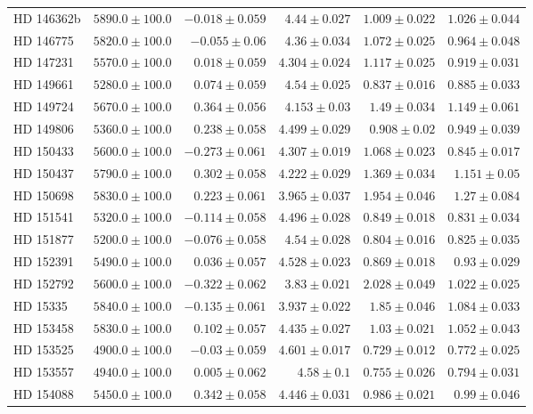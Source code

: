 \begin{longtable*}{lrrrrr}
HD 146362b & $5890.0\pm 100.0$ & $-0.018\pm 0.059$ & $4.44\pm 0.027$ & $1.009\pm 0.022$ & $1.026\pm 0.044$ \\ 
HD 146775 & $5820.0\pm 100.0$ & $-0.055\pm 0.06$ & $4.36\pm 0.034$ & $1.072\pm 0.025$ & $0.964\pm 0.048$ \\ 
HD 147231 & $5570.0\pm 100.0$ & $0.018\pm 0.059$ & $4.304\pm 0.024$ & $1.117\pm 0.025$ & $0.919\pm 0.031$ \\ 
HD 149661 & $5280.0\pm 100.0$ & $0.074\pm 0.059$ & $4.54\pm 0.025$ & $0.837\pm 0.016$ & $0.885\pm 0.033$ \\ 
HD 149724 & $5670.0\pm 100.0$ & $0.364\pm 0.056$ & $4.153\pm 0.03$ & $1.49\pm 0.034$ & $1.149\pm 0.061$ \\ 
HD 149806 & $5360.0\pm 100.0$ & $0.238\pm 0.058$ & $4.499\pm 0.029$ & $0.908\pm 0.02$ & $0.949\pm 0.039$ \\ 
HD 150433 & $5600.0\pm 100.0$ & $-0.273\pm 0.061$ & $4.307\pm 0.019$ & $1.068\pm 0.023$ & $0.845\pm 0.017$ \\ 
HD 150437 & $5790.0\pm 100.0$ & $0.302\pm 0.058$ & $4.222\pm 0.029$ & $1.369\pm 0.034$ & $1.151\pm 0.05$ \\ 
HD 150698 & $5830.0\pm 100.0$ & $0.223\pm 0.061$ & $3.965\pm 0.037$ & $1.954\pm 0.046$ & $1.27\pm 0.084$ \\ 
HD 151541 & $5320.0\pm 100.0$ & $-0.114\pm 0.058$ & $4.496\pm 0.028$ & $0.849\pm 0.018$ & $0.831\pm 0.034$ \\ 
HD 151877 & $5200.0\pm 100.0$ & $-0.076\pm 0.058$ & $4.54\pm 0.028$ & $0.804\pm 0.016$ & $0.825\pm 0.035$ \\ 
HD 152391 & $5490.0\pm 100.0$ & $0.036\pm 0.057$ & $4.528\pm 0.023$ & $0.869\pm 0.018$ & $0.93\pm 0.029$ \\ 
HD 152792 & $5600.0\pm 100.0$ & $-0.322\pm 0.062$ & $3.83\pm 0.021$ & $2.028\pm 0.049$ & $1.022\pm 0.025$ \\ 
HD 15335 & $5840.0\pm 100.0$ & $-0.135\pm 0.061$ & $3.937\pm 0.022$ & $1.85\pm 0.046$ & $1.084\pm 0.033$ \\ 
HD 153458 & $5830.0\pm 100.0$ & $0.102\pm 0.057$ & $4.435\pm 0.027$ & $1.03\pm 0.021$ & $1.052\pm 0.043$ \\ 
HD 153525 & $4900.0\pm 100.0$ & $-0.03\pm 0.059$ & $4.601\pm 0.017$ & $0.729\pm 0.012$ & $0.772\pm 0.025$ \\ 
HD 153557 & $4940.0\pm 100.0$ & $0.005\pm 0.062$ & $4.58\pm 0.1$ & $0.755\pm 0.026$ & $0.794\pm 0.031$ \\ 
HD 154088 & $5450.0\pm 100.0$ & $0.342\pm 0.058$ & $4.446\pm 0.031$ & $0.986\pm 0.021$ & $0.99\pm 0.046$ \\ 

\end{longtable*}
